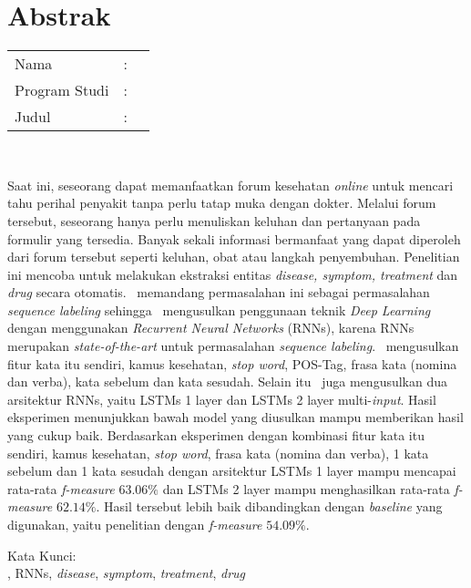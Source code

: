 %
%
%

\chapter*{Abstrak}

\vspace*{0.2cm}

\noindent \begin{tabular}{l l p{10cm}}
	Nama&: & \penulis \\
	Program Studi&: & \program \\
	Judul&: & \judul \\
\end{tabular} \\ 

\vspace*{0.5cm}

\noindent
Saat ini, seseorang dapat memanfaatkan forum kesehatan \textit{online} untuk mencari tahu perihal penyakit tanpa perlu tatap muka dengan dokter.  Melalui forum tersebut, seseorang hanya perlu menuliskan keluhan dan pertanyaan pada formulir yang tersedia. Banyak sekali informasi bermanfaat yang dapat diperoleh dari forum tersebut seperti keluhan, obat atau langkah penyembuhan. Penelitian ini mencoba untuk melakukan ekstraksi entitas \textit{disease, symptom, treatment} dan \textit{drug} secara otomatis. \Saya~memandang permasalahan ini sebagai permasalahan \textit{sequence labeling} sehingga \saya~mengusulkan penggunaan teknik \textit{Deep Learning} dengan menggunakan \textit{Recurrent Neural Networks} (RNNs), karena RNNs merupakan \textit{state-of-the-art} untuk permasalahan \textit{sequence labeling}. \Saya~mengusulkan fitur kata itu sendiri, kamus kesehatan, \textit{stop word}, POS-Tag, frasa kata (nomina dan verba), kata sebelum dan kata sesudah. Selain itu \saya~juga mengusulkan dua arsitektur RNNs, yaitu LSTMs 1 layer dan LSTMs 2 layer multi-\textit{input}. Hasil eksperimen menunjukkan bawah model yang diusulkan mampu memberikan hasil yang cukup baik. Berdasarkan eksperimen dengan kombinasi fitur kata itu sendiri, kamus kesehatan, \textit{stop word}, frasa kata (nomina dan verba), 1 kata sebelum dan 1 kata sesudah dengan arsitektur LSTMs 1 layer mampu mencapai rata-rata \textit{f-measure} $ 63.06\% $ dan LSTMs 2 layer mampu menghasilkan rata-rata \textit{f-measure} $ 62.14\% $. Hasil tersebut lebih baik dibandingkan dengan \textit{baseline} yang digunakan, yaitu penelitian \cite{skripsiKakRadit} dengan \textit{f-measure} $ 54.09\% $.


\vspace*{0.2cm}

\noindent Kata Kunci: \\ 
\noindent \mer, RNNs, \textit{disease}, \textit{symptom}, \textit{treatment}, \textit{drug} \\ 

\newpage